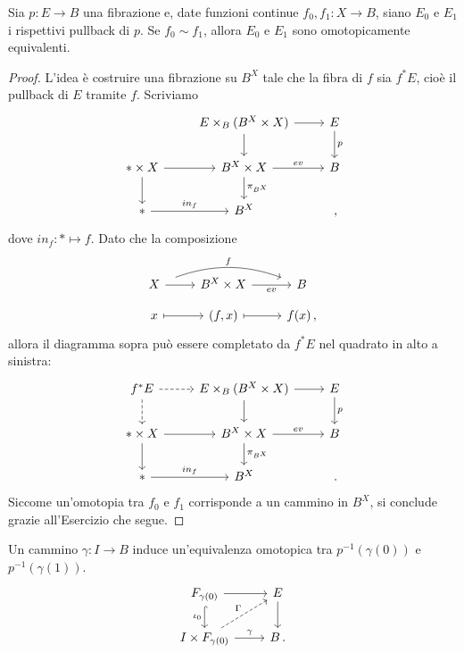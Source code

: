 \begin{prop}
	Sia $p:E \to B$ una fibrazione e,
	date funzioni continue
	$f_{0},f_{1}: X \to B$,
	siano $E_{0}$ e $E_{1}$ i rispettivi
	pullback di $p$.
	Se $f_{0} \sim f_{1}$, allora $E_{0}$ e $E_{1}$ sono
	omotopicamente equivalenti.
	\begin{proof}
		L'idea è costruire una fibrazione su $B^{X}$ 
		tale che la fibra di $f$ sia $f^{*}E$,
		cioè il pullback di $E$ tramite $f$.
		Scriviamo
		\begin{equation*}
			\begin{tikzcd}
				& E \times_{B} (B^{X} \times X) \ar[r] \ar[d]
				& E \ar[d, "p"] \\
				\ast \times X \ar[r] \ar[d] 
				& B^{X} \times X \ar[r, "ev"] \ar[d, "\pi_{B^{X}}"] & B \\
				\ast \ar[r, "in_{f}"] & B^{X} & \,,
			\end{tikzcd}
		\end{equation*}
		dove $in_{f}: \ast \mapsto f$. Dato che la composizione
		\begin{equation*}
			\begin{tikzcd}[row sep=small]
				X \ar[r] \ar[rr, bend left=20, "f", shorten=2ex] 
				& B^{X} \times X \ar[r, "ev"'] & B \\
				x \ar[r, mapsto] 
				& (f,x) \ar[r, mapsto] & f(x)\,,
			\end{tikzcd}
		\end{equation*}
		allora il diagramma sopra può essere completato da $f^*E$
		nel quadrato in alto a sinistra:
		\begin{equation*}
			\begin{tikzcd}
				f^*E \ar[d, dashed] \ar[r, dashed] 
				& E \times_{B} (B^{X} \times X) \ar[r] \ar[d]
				& E \ar[d, "p"] \\
				\ast \times X \ar[r] \ar[d] 
				& B^{X} \times X \ar[r, "ev"] \ar[d, "\pi_{B^{X}}"] & B \\
				\ast \ar[r, "in_{f}"] & B^{X} & \,.
			\end{tikzcd}
		\end{equation*}
		Siccome un'omotopia tra $f_{0}$ e $f_{1}$ 
		corrisponde a un cammino in $B^{X}$,
		si conclude grazie all'Esercizio che segue.
	\end{proof}
\end{prop}

\begin{exercise}
	Un cammino $\gamma : I \to B$ induce un'equivalenza omotopica
	tra $p^{-1}(\gamma(0))$ e $p^{-1}(\gamma(1))$.
	\begin{equation*}
		\begin{tikzcd}
			F_{\gamma(0)} \ar[r] \ar[d, "\iota_{0}"', hook] 
			& E \ar[d] \\
			I \times F_{\gamma(0)} \ar[r, "\gamma"] \ar[ur, "\Gamma", dashed]
			& B\,.
		\end{tikzcd}
	\end{equation*}
\end{exercise}

